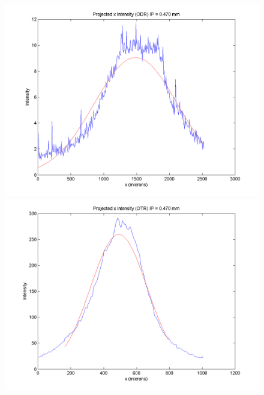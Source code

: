 \documentclass[12pt]{article}
\begin{document}
\begin{figure}
\begin{center}
\includegraphics[scale=0.5]{Figures/ProjX_ODR_470.PNG}
\includegraphics[scale=0.5]{Figures/ProjX_OTR_470.PNG}
\caption{}
\end{center}
\end{figure}
\end{document}
